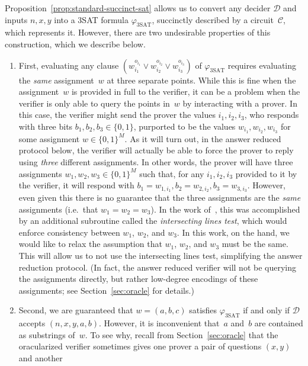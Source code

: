 \documentclass[11pt]{article}
\theoremstyle{definition}
\newcommand{\decider}{\mathcal{D}}
\newcommand{\circuit}{\mathcal{C}}
\begin{document}
Proposition~\ref{prop:standard-succinct-sat} allows us to convert any decider
$\decider$ and inputs $n, x, y$ into a 3SAT formula $\varphi_{\mathrm{3SAT}}$,
succinctly described by a circuit~$\circuit$, which represents it.
However, there are two undesirable properties of this construction, which we
describe below.
\begin{enumerate}
\item First, evaluating any clause $(w_{i_1}^{o_{i_1}} \lor
  w_{i_2}^{o_{i_2}}\lor w_{i_3}^{o_{i_3}})$ of $\varphi_{\mathrm{3SAT}}$
  requires evaluating the \emph{same} assignment~$w$ at three separate points.
	While this is fine when the assignment~$w$ is provided in full to the
  verifier, it can be a problem when the verifier is only able to query the
  points in~$w$ by interacting with a prover.
	In this case, the verifier might send the prover the values $i_1, i_2, i_3$,
  who responds with three bits $b_1, b_2, b_3 \in \{0, 1\}$, purported to be the
  values $w_{i_1}, w_{i_2}, w_{i_3}$ for some assignment $w \in \{0, 1\}^M$.
	As it will turn out, in the answer reduced protocol below, the verifier will
  actually be able to force the prover to reply using \emph{three} different
  assignments.
	In other words, the prover will have three assignments $w_1, w_2, w_3 \in \{0,
  1\}^M$ such that, for any $i_1, i_2, i_3$ provided to it by the verifier, it
  will respond with $b_1 = w_{1, i_1}, b_2 = w_{2, i_2}, b_3 = w_{3, i_3}$.
	However, even given this there is no guarantee that the three assignments are
  the \emph{same} assignments (i.e.\ that $w_1 = w_2 = w_3$).
	In the work of~\cite{NW19}, this was accomplished by an additional subroutine
  called the \emph{intersecting lines test}, which would enforce consistency
  between $w_1$, $w_2$, and $w_3$.
	In this work, on the hand, we would like to relax the assumption that $w_1$,
  $w_2$, and $w_3$ must be the same.
	This will allow us to not use the intersecting lines test, simplifying the
  answer reduction protocol.
	(In fact, the answer reduced verifier will not be querying the assignments
  directly, but rather low-degree encodings of these assignments; see
  Section~\ref{sec:oracle} for details.)
\item Second, we are guaranteed that $w = (a, b, c)$ satisfies
  $\varphi_{\mathrm{3SAT}}$ if and only if $\decider$ accepts $(n, x, y, a, b)$.
	However, it is inconvenient that~$a$ and~$b$ are contained as substrings
  of~$w$.
	To see why, recall from Section~\ref{sec:oracle} that the oracularized
  verifier sometimes gives one prover a pair of questions $(x, y)$ and another

\end{enumerate}
\end{document}
